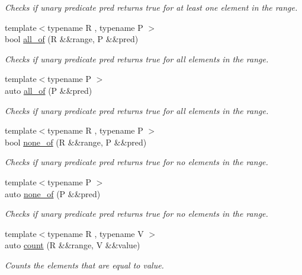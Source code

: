 \begin{DoxyCompactItemize}
\begin{DoxyCompactList}\small\item\em Checks if unary predicate pred returns true for at least one element in the range. \end{DoxyCompactList}\item 
{\footnotesize template$<$typename R , typename P $>$ }\\bool \mbox{\hyperlink{namespacerah_aaf7abb6066c8adfe6959691c3a3ea4e2}{all\+\_\+of}} (R \&\&range, P \&\&pred)
\begin{DoxyCompactList}\small\item\em Checks if unary predicate pred returns true for all elements in the range. \end{DoxyCompactList}\item 
{\footnotesize template$<$typename P $>$ }\\auto \mbox{\hyperlink{namespacerah_a4066165c960917a330beeed75a0f96e7}{all\+\_\+of}} (P \&\&pred)
\begin{DoxyCompactList}\small\item\em Checks if unary predicate pred returns true for all elements in the range. \end{DoxyCompactList}\item 
{\footnotesize template$<$typename R , typename P $>$ }\\bool \mbox{\hyperlink{namespacerah_a2a3ff8b7f73d480ac0827f9a41a3c92a}{none\+\_\+of}} (R \&\&range, P \&\&pred)
\begin{DoxyCompactList}\small\item\em Checks if unary predicate pred returns true for no elements in the range. \end{DoxyCompactList}\item 
{\footnotesize template$<$typename P $>$ }\\auto \mbox{\hyperlink{namespacerah_aa05e58774ee8e9e05cd3e6ed2a2fa372}{none\+\_\+of}} (P \&\&pred)
\begin{DoxyCompactList}\small\item\em Checks if unary predicate pred returns true for no elements in the range. \end{DoxyCompactList}\item 
{\footnotesize template$<$typename R , typename V $>$ }\\auto \mbox{\hyperlink{namespacerah_aa528865cc4a45d4eb276329554f16b4b}{count}} (R \&\&range, V \&\&value)
\begin{DoxyCompactList}\small\item\em Counts the elements that are equal to value. \end{DoxyCompactList}\item 

\end{DoxyCompactItemize}
